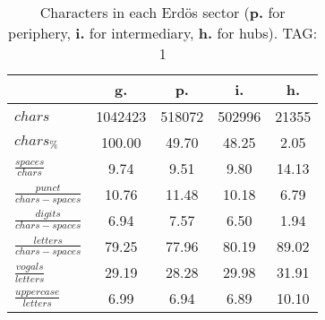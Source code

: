 \begin{table}[h!]
\begin{center}
\begin{tabular}{| l | c | c | c | c |}\hline
 & g. & p. & i. & h. \\\hline
$chars$ & 1042423  & 518072  & 502996  & 21355 \\\hline
$chars_{\%}$ & 100.00  & 49.70  & 48.25  & 2.05 \\\hline
$\frac{spaces}{chars}$ & 9.74  & 9.51  & 9.80  & 14.13 \\\hline
$\frac{punct}{chars-spaces}$ & 10.76  & 11.48  & 10.18  & 6.79 \\\hline
$\frac{digits}{chars-spaces}$ & 6.94  & 7.57  & 6.50  & 1.94 \\\hline
$\frac{letters}{chars-spaces}$ & 79.25  & 77.96  & 80.19  & 89.02 \\\hline
$\frac{vogals}{letters}$ & 29.19  & 28.28  & 29.98  & 31.91 \\\hline
$\frac{uppercase}{letters}$ & 6.99  & 6.94  & 6.89  & 10.10 \\\hline
\end{tabular}
\caption{Characters in each Erd\"os sector ({{\bf p.}} for periphery, {{\bf i.}} for intermediary, 
    {{\bf h.}} for hubs). TAG: 1}
\end{center}
\end{table}